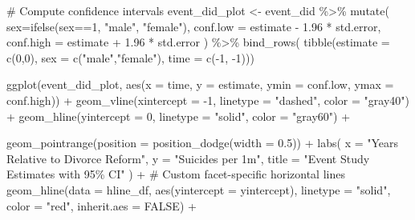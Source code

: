 \documentclass[
  letterpaper,
  DIV=11,
  numbers=noendperiod]{scrartcl}
\newenvironment{Shaded}{\begin{snugshade}}{\end{snugshade}}
\newcommand{\AttributeTok}[1]{\textcolor[rgb]{0.40,0.45,0.13}{#1}}
\newcommand{\CommentTok}[1]{\textcolor[rgb]{0.37,0.37,0.37}{#1}}
\newcommand{\ConstantTok}[1]{\textcolor[rgb]{0.56,0.35,0.01}{#1}}
\newcommand{\DecValTok}[1]{\textcolor[rgb]{0.68,0.00,0.00}{#1}}
\newcommand{\FloatTok}[1]{\textcolor[rgb]{0.68,0.00,0.00}{#1}}
\newcommand{\FunctionTok}[1]{\textcolor[rgb]{0.28,0.35,0.67}{#1}}
\newcommand{\NormalTok}[1]{\textcolor[rgb]{0.00,0.23,0.31}{#1}}
\newcommand{\OtherTok}[1]{\textcolor[rgb]{0.00,0.23,0.31}{#1}}
\newcommand{\SpecialCharTok}[1]{\textcolor[rgb]{0.37,0.37,0.37}{#1}}
\newcommand{\StringTok}[1]{\textcolor[rgb]{0.13,0.47,0.30}{#1}}
\begin{document}
\begin{Shaded}
\begin{Highlighting}[]
\CommentTok{\# Compute confidence intervals}
\NormalTok{event\_did\_plot }\OtherTok{\textless{}{-}}\NormalTok{ event\_did }\SpecialCharTok{\%\textgreater{}\%}
  \FunctionTok{mutate}\NormalTok{(}
    \AttributeTok{sex=}\FunctionTok{ifelse}\NormalTok{(sex}\SpecialCharTok{==}\DecValTok{1}\NormalTok{, }\StringTok{"male"}\NormalTok{, }\StringTok{"female"}\NormalTok{),}
    \AttributeTok{conf.low =}\NormalTok{ estimate }\SpecialCharTok{{-}} \FloatTok{1.96} \SpecialCharTok{*}\NormalTok{ std.error,}
    \AttributeTok{conf.high =}\NormalTok{ estimate }\SpecialCharTok{+} \FloatTok{1.96} \SpecialCharTok{*}\NormalTok{ std.error}
\NormalTok{  )  }\SpecialCharTok{\%\textgreater{}\%}  
  \FunctionTok{bind\_rows}\NormalTok{(}
    \FunctionTok{tibble}\NormalTok{(}\AttributeTok{estimate =} \FunctionTok{c}\NormalTok{(}\DecValTok{0}\NormalTok{,}\DecValTok{0}\NormalTok{), }\AttributeTok{sex =} \FunctionTok{c}\NormalTok{(}\StringTok{"male"}\NormalTok{,}\StringTok{"female"}\NormalTok{), }\AttributeTok{time =} \FunctionTok{c}\NormalTok{(}\SpecialCharTok{{-}}\DecValTok{1}\NormalTok{, }\SpecialCharTok{{-}}\DecValTok{1}\NormalTok{)))}

\FunctionTok{ggplot}\NormalTok{(event\_did\_plot, }\FunctionTok{aes}\NormalTok{(}\AttributeTok{x =}\NormalTok{ time, }\AttributeTok{y =}\NormalTok{ estimate, }\AttributeTok{ymin =}\NormalTok{ conf.low, }\AttributeTok{ymax =}\NormalTok{ conf.high)) }\SpecialCharTok{+}
  \FunctionTok{geom\_vline}\NormalTok{(}\AttributeTok{xintercept =} \SpecialCharTok{{-}}\DecValTok{1}\NormalTok{, }\AttributeTok{linetype =} \StringTok{"dashed"}\NormalTok{, }\AttributeTok{color =} \StringTok{"gray40"}\NormalTok{) }\SpecialCharTok{+}
  \FunctionTok{geom\_hline}\NormalTok{(}\AttributeTok{yintercept =} \DecValTok{0}\NormalTok{, }\AttributeTok{linetype =} \StringTok{"solid"}\NormalTok{, }\AttributeTok{color =} \StringTok{"gray60"}\NormalTok{) }\SpecialCharTok{+}
   
  \FunctionTok{geom\_pointrange}\NormalTok{(}\AttributeTok{position =} \FunctionTok{position\_dodge}\NormalTok{(}\AttributeTok{width =} \FloatTok{0.5}\NormalTok{)) }\SpecialCharTok{+}
  \FunctionTok{labs}\NormalTok{(}
    \AttributeTok{x =} \StringTok{"Years Relative to Divorce Reform"}\NormalTok{,}
    \AttributeTok{y =} \StringTok{"Suicides per 1m"}\NormalTok{,}
    \AttributeTok{title =} \StringTok{"Event Study Estimates with 95\% CI"}
\NormalTok{  ) }\SpecialCharTok{+}
  \CommentTok{\# Custom facet{-}specific horizontal lines}
  \FunctionTok{geom\_hline}\NormalTok{(}\AttributeTok{data =}\NormalTok{ hline\_df, }\FunctionTok{aes}\NormalTok{(}\AttributeTok{yintercept =}\NormalTok{ yintercept), }
             \AttributeTok{linetype =} \StringTok{"solid"}\NormalTok{, }\AttributeTok{color =} \StringTok{"red"}\NormalTok{, }\AttributeTok{inherit.aes =} \ConstantTok{FALSE}\NormalTok{) }\SpecialCharTok{+}


\end{Highlighting}
\end{Shaded}
\end{document}
